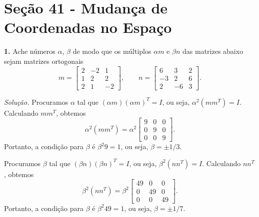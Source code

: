 \documentclass[a4paper,11pt]{article}
\begin{document}
\section*{Seção 41 - Mudança de Coordenadas no Espaço}

\textbf{1.}
Ache números $\alpha$, $\beta$ de modo que os múltiplos $\alpha m$ e $\beta n$ das matrizes abaixo sejam matrizes ortogonais
\[
  m =
  \begin{bmatrix}
    2 & -2 & 1 \\
    1 & 2 & 2 \\
    2 & 1 & -2
  \end{bmatrix},
  \qquad n =
  \begin{bmatrix}
    6 & 3 & 2 \\
    -3 & 2 & 6 \\
    2 & -6 & 3
  \end{bmatrix}.
\]

\vspace{\baselineskip}

\emph{Solução.}
Procuramos $\alpha$ tal que $(\alpha m)(\alpha m)^T = I$, ou seja, $\alpha^2 (m m^T) = I$.
Calculando $mm^T$, obtemos
\[
  \alpha^2 (mm^T) = \alpha^2
  \begin{bmatrix}
    9 & 0 & 0 \\
    0 & 9 & 0 \\
    0 & 0 & 9
  \end{bmatrix}.
\]
Portanto, a condição para $\beta$ é $\beta^2 9 = 1$, ou seja, $\beta = \pm 1/3$.

Procuramos $\beta$ tal que $(\beta n)(\beta n)^T = I$, ou seja, $\beta^2 (n n^T) = I$.
Calculando $nn^T$, obtemos
\[
  \beta^2 (nn^T) = \beta^2
  \begin{bmatrix}
    49 & 0 & 0 \\
    0 & 49 & 0 \\
    0 & 0 & 49
  \end{bmatrix}.
\]
Portanto, a condição para $\beta$ é $\beta^2 49 = 1$, ou seja, $\beta = \pm 1/7$.
\end{document}
